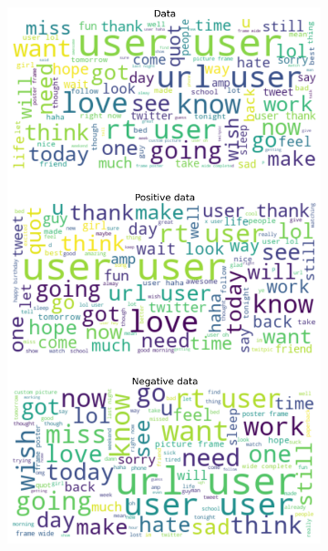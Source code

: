 \documentclass{article}
\begin{document}
\begin{itemize}
  \begin{figure}[H]
    \centering
    \captionsetup{justification=centering}
    \begin{subfigure}[b]{0.24\textwidth}
      \centering
      \includegraphics[width=\textwidth]{chapter-06/section-01-01/17/visualization/1/wordcloud.png}
    \end{subfigure}
    \begin{subfigure}[b]{0.24\textwidth}
      \centering

\end{subfigure}
\end{figure}
\end{itemize}
\end{document}
